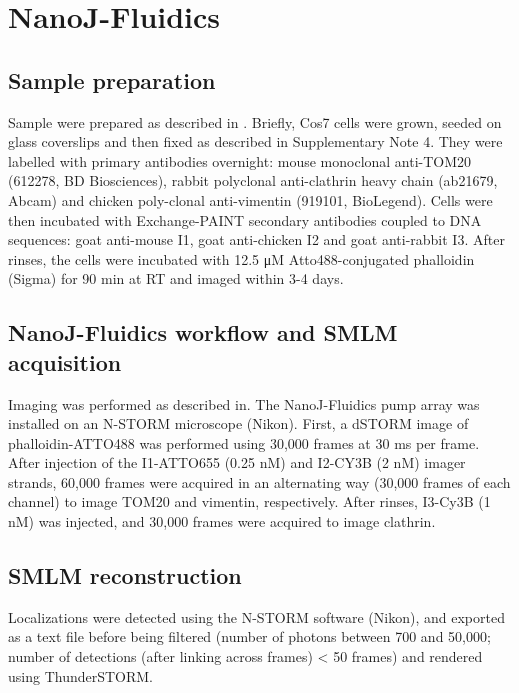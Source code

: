 \section{NanoJ-Fluidics}

\subsection{Sample preparation}

Sample were prepared as described in \cite{almada2018automating}. Briefly, Cos7 cells were grown, seeded on glass coverslips and then fixed as described in Supplementary Note 4. They were labelled with primary antibodies overnight: mouse monoclonal anti-TOM20 (612278, BD Biosciences), rabbit polyclonal anti-clathrin heavy chain (ab21679, Abcam) and chicken poly-clonal anti-vimentin (919101, BioLegend). Cells were then incubated with Exchange-PAINT secondary antibodies coupled to DNA sequences: goat anti-mouse I1, goat anti-chicken I2 and goat anti-rabbit I3. After rinses, the cells were incubated with 12.5 μM Atto488-conjugated phalloidin (Sigma) for 90 min at RT and imaged within 3-4 days. 

\subsection{NanoJ-Fluidics workflow and SMLM acquisition}

Imaging was performed as described in\cite{almada2018automating}. The NanoJ-Fluidics pump array was installed on an N-STORM microscope (Nikon). First, a dSTORM image of phalloidin-ATTO488 was performed using 30,000 frames at 30 ms per frame. After injection of the I1-ATTO655 (0.25 nM) and I2-CY3B (2 nM) imager strands, 60,000 frames were acquired in an alternating way (30,000 frames of each channel) to image TOM20 and vimentin, respectively. After rinses, I3-Cy3B (1 nM) was injected, and 30,000 frames were acquired to image clathrin.

\subsection{SMLM reconstruction}

Localizations were detected using the N-STORM software (Nikon), and exported as a text file before being filtered (number of photons between 700 and 50,000; number of detections (after linking across frames) < 50 frames) and rendered using ThunderSTORM.





